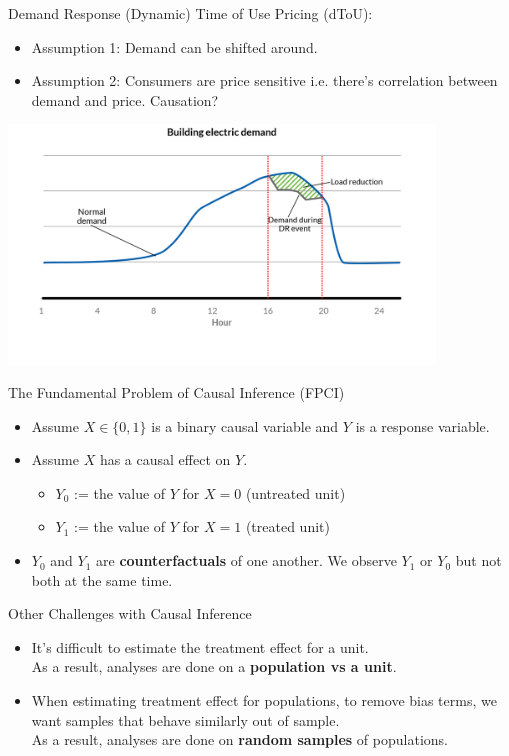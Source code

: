\documentclass{beamer}
\begin{document}
\begin{frame}{Demand Response}
  (Dynamic) Time of Use Pricing (dToU):
  \begin{itemize}
    \item Assumption 1: Demand can be shifted around.
    \item Assumption 2: Consumers are price sensitive i.e. there's correlation between demand and price. Causation?
  \end{itemize}
  \vspace{0.2cm}
  \centering
  \includegraphics[width=0.85\textwidth]{images/demand-response.png}
\end{frame}

\begin{frame}{The Fundamental Problem of Causal Inference (FPCI)}
  \begin{itemize}
    \item<+-> Assume $X \in\{0,1\}$ is a binary causal variable and $Y$ is a response variable.
    \item<+-> Assume $X$ has a causal effect on $Y$.
    \begin{itemize}
      \item $Y_0$ := the value of $Y$ for $X=0$ (untreated unit)
      \item $Y_1$ := the value of $Y$ for $X=1$ (treated unit)
    \end{itemize}
    \item<+-> $Y_0$ and $Y_1$ are \textbf{counterfactuals} of one another. We observe $Y_1$ or $Y_0$ but not both at the same time.
  \end{itemize}
\end{frame}

\begin{frame}{Other Challenges with Causal Inference}
  \begin{itemize}
    \item<+-> It's difficult to estimate the treatment effect for a unit. \\
    \indent As a result, analyses are done on a \textbf{population vs a unit}.
    \item<+-> When estimating treatment effect for populations, to remove bias terms, we want samples that behave similarly out of sample. \\
    \indent As a result, analyses are done on \textbf{random samples} of populations.
  \end{itemize}
\end{frame}
\end{document}
